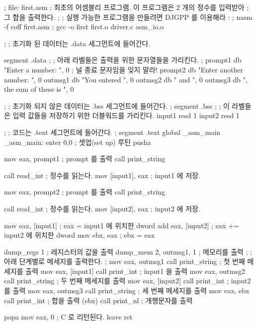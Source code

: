 \begin{AsmCodeListing}[label=first.asm]
; file: first.asm
; 최초의 어셈블리 프로그램. 이 프로그램은 2 개의 정수를 입력받아
; 그 합을 출력한다. 
;
; 실행 가능한 프로그램을 만들려면 DJGPP 를 이용해라 : 
; nasm -f coff first.asm
; gcc -o first first.o driver.c asm_io.o

;
; 초기화 된 데이터는 .data 세그먼트에 들어간다.

segment .data
;
; 아래 라벨들은 출력을 위한 문자열들을 가리킨다. 
;
prompt1 db    "Enter a number: ", 0       ; 널 종료 문자임을 잊지 말라!
prompt2 db    "Enter another number: ", 0
outmsg1 db    "You entered ", 0
outmsg2 db    " and ", 0
outmsg3 db    ", the sum of these is ", 0

;
; 초기화 되지 않은 데이터는 .bss 세그먼트에 들어간다. 
;
segment .bss
;
; 이 라벨들은 입력 값들을 저장하기 위한 더블워드를 가리킨다. 
input1  resd 1
input2  resd 1

;
; 코드는 .text 세그먼트에 들어간다.
;
segment .text
        global  _asm_main
_asm_main:
        enter   0,0               ; 셋업(set up) 루틴
        pusha

        mov     eax, prompt1      ; prompt 를 출력
        call    print_string

        call    read_int          ; 정수를 읽는다. 
        mov     [input1], eax     ; input1 에 저장.

        mov     eax, prompt2      ; prompt 를 출력
        call    print_string

        call    read_int          ; 정수를 읽는다. 
        mov     [input2], eax     ; input2 에 저장. 

        mov     eax, [input1]     ; eax = input1 에 위치한 dword
        add     eax, [input2]     ; eax += input2 에 위치한 dword
        mov     ebx, eax          ; ebx = eax

        dump_regs 1                ; 레지스터의 값을 출력
        dump_mem  2, outmsg1, 1    ; 메모리를 출력
;
; 아래 단계별로 메세지를 출력한다. 
;
        mov     eax, outmsg1
        call    print_string      ; 첫 번째 메세지를 출력
        mov     eax, [input1]     
        call    print_int         ; input1 을 출력
        mov     eax, outmsg2
        call    print_string      ; 두 번째 메세지를 출력
        mov     eax, [input2]
        call    print_int         ; input2 를 출력
        mov     eax, outmsg3
        call    print_string      ; 세 번째 메세지를 출력
        mov     eax, ebx
        call    print_int         ; 합을 출력 (ebx)
        call    print_nl          ; 개행문자를 출력

        popa
        mov     eax, 0            ; C 로 리턴된다. 
        leave                     
        ret
\end{AsmCodeListing}

